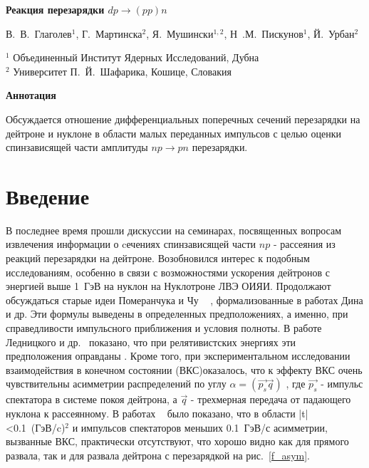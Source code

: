 \documentclass[a4paper,12pt]{article}
\begin{document}
\begin{center}
  \Large\bf {Реакция перезарядки $dp \to (pp)n$}
\end{center}

\begin{center}
  \noindent \large\textrm {В.~В.~Глаголев$^{1}$, Г.~Мартинска$^{2}$,
    Я.~Мушински$^{1, 2}$, Н~.М.~Пискунов$^{1}$, Й.~Урбан$^{2}$}
\end{center}
\vspace {0.5cm}
\small {$^{1}$ Объединенный Институт Ядерных Исследований, Дубна \\
  $^{2}$ Университет П.~Й.~Шафарика, Кошице, Словакия \\}

\begin{center} {\bf Аннотация}
\end{center}
\vspace{0.5cm} Обсуждается отношение дифференциальных поперечных
сечений перезарядки на дейтроне и нуклоне в области малых переданных
импульсов с целью оценки спинзависящей части амплитуды $np\to pn$
перезарядки.

\section{Введение}
В последнее время прошли дискуссии на семинарах, посвященных вопросам
извлечения информации о cечениях спинзависящей части $np$ - рассеяния
из реакций перезарядки на дейтроне. Возобновился интерес к подобным
исследованиям, особенно в связи с возможностями ускорения дейтронов с
энергией выше 1~ГэВ на нуклон на Нуклотроне ЛВЭ ОИЯИ.  Продолжают
обсуждаться старые идеи Померанчука и Чу ~\cite{a1} , формализованные
в работах Дина и др. Эти формулы выведены в определенных
предположениях, а именно, при справедливости импульсного приближения и
условия полноты.  В работе Ледницкого и др.~\cite{a2} показано, что
при релятивистских энергиях эти предположения оправданы .  Кроме того,
при экспериментальном исследовании взаимодействия в конечном состоянии
(ВКС)оказалось, что к эффекту ВКС очень чувствительны асимметрии
распределений по углу $\alpha=(\vec{p_s}\vec{q})$ , где $\vec{p_s}$ -
импульс спектатора в системе покоя дейтрона, а $\vec{q}$ - трехмерная
передача от падающего нуклона к рассеянному. В работах ~\cite{a3,a4}
было показано, что в области |t|<0.1~(ГэВ/c)$^{2}$ и импульсов
спектаторов меньших 0.1~ГэВ/с асимметрии, вызванные ВКС, практически
отсутствуют, что хорошо видно как для прямого развала, так и для
развала дейтрона с перезарядкой на рис.~\ref{f_asym}.
\end{document}
